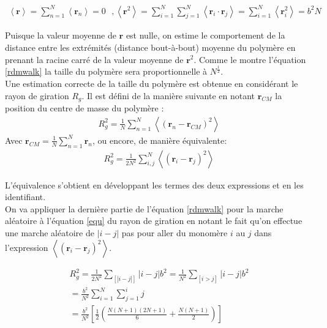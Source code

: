 \begin{eqnarray}
\left<\textbf{r}\right>\text{} = \sum_{n = 1}^{N} \left<\textbf{r}_n \right>\text{} =\text{} 0 \text{ }, \text{} \left<\textbf{r}^2\right> \text{}= \sum_{i = 1}^{N} \sum_{j = 1}^{N} \left<\textbf{r}_i \cdot \textbf{r}_j\right> \text{}= \sum_{i = 1}^{N} \left<\textbf{r}_i^2\right> \text{}= b^2 N
\label{rdmwalk}
\end{eqnarray}

 Puisque la valeur moyenne de $\textbf{r}$ est nulle, on estime le comportement de la distance entre les extrémités (distance bout-à-bout) moyenne du polymère en prenant la racine carré de la valeur moyenne de $\textbf{r}^2$. Comme le montre l'équation \ref{rdmwalk} la taille du polymère sera proportionnelle à $N^\frac{1}{2}$.\\
 
 Une estimation correcte de la taille du polymère est obtenue en considérant le rayon de giration $R_g$. Il est défini de la manière suivante en notant $\textbf{r}_{CM}$ la position du centre de masse du polymère :
 \begin{eqnarray}
R_g^2\text{}=\text{}\frac{1}{N}\sum_{n = 1}^{N} \left<(\textbf{r}_n-\textbf{r}_{CM})^2\right>
\label{equ}
\end{eqnarray}
 Avec $\textbf{r}_{CM}=\frac{1}{N}\sum_{n = 1}^{N} \textbf{r}_n$, ou encore, de manière équivalente: 
  \begin{eqnarray}
R_g^2\text{}=\text{}\frac{1}{2N^2}\sum_{i,j}^N \left<(\textbf{r}_i-\textbf{r}_{j})^2\right>
\label{equbthnth}
\end{eqnarray}
 
 \noindent L'équivalence s'obtient en développant les termes des deux expressions et en les identifiant.\\


On va appliquer la dernière partie de l'équation \ref{rdmwalk} pour la marche aléatoire à l'équation \ref{equ} du rayon de giration en notant le fait qu'on effectue une marche aléatoire de $|i-j|$ pas pour aller du monomère $i$ au $j$ dans l'expression $\left<(\textbf{r}_i - \textbf{r}_j)^2\right>$.

\begin{gather}
R_g^2\text{}=\text{}\frac{1}{2N^2}\sum_{[|i-j|]} |i-j| b^2=\text{}\frac{1}{N^2}\sum_{[i>j]} |i-j| b^2\nonumber \\
=\text{}\frac{b^2}{N^2} \sum_{i=1}^N \sum_{j=1}^{i} j \\
 = \text{}\frac{b^2}{N^2}[\frac{1}{2}(\frac{N(N+1)(2N+1)}{6}+\frac{N(N+1)}{2})]\nonumber
\label{equationgyr}
\end{gather}

